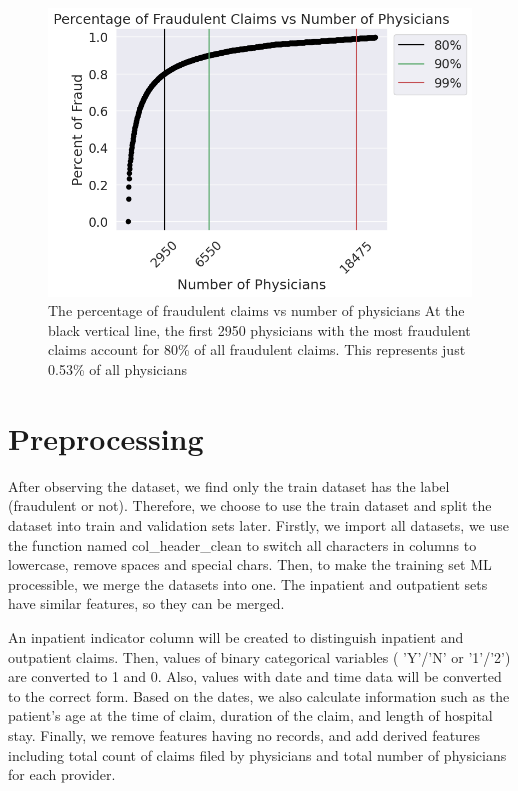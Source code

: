 \documentclass[twoside,11pt]{article}
\begin{document}
\begin{figure}[!htbp]
  \centering
  \includegraphics[width=\textwidth]{./img/fraud.png}
  \caption{The percentage of fraudulent claims vs number of physicians
  At the black vertical line, the first 2950 
  physicians with the most fraudulent claims account for 80\% of all fraudulent
  claims. This represents just 0.53\% of all physicians}
\end{figure}
\clearpage

\section{Preprocessing}

 After observing the dataset, we find only the train dataset has the label
 (fraudulent or not). Therefore, we choose to use the train dataset and 
 split the dataset into train and validation sets later. 
Firstly, we import all datasets, we use the function named col\_header\_clean
 to switch all characters in columns to lowercase, remove spaces and special chars.
  Then, to make the training set ML processible, we merge the datasets into one. 
  The inpatient and outpatient sets have similar features, so they can be merged.

  An inpatient indicator column will be created to distinguish inpatient and 
   outpatient claims. Then, values of binary categorical variables (
    'Y'/'N' or '1'/'2') are converted to 1 and 0. Also, values with 
    date and time data will be converted to the correct form. Based on the dates, 
    we also calculate information such as the patient's age at the time of claim, 
    duration of the claim, and length of hospital stay. Finally, we remove features
    having no records, and add derived features including total count of claims filed
    by physicians and total number of physicians for each provider.
\end{document}
